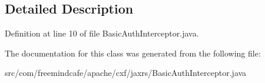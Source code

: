 \subsection{Detailed Description}


Definition at line 10 of file Basic\+Auth\+Interceptor.\+java.



The documentation for this class was generated from the following file\+:\begin{DoxyCompactItemize}
\item 
src/com/freemindcafe/apache/cxf/jaxrs/Basic\+Auth\+Interceptor.\+java\end{DoxyCompactItemize}
